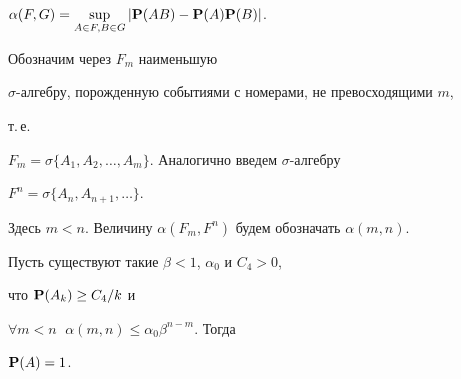 $\alpha(F,G)=\sup\limits_{A\in F,B\in G}|{\bold P}(AB)-{\bold P} 


(A){\bold P}(B)|$. 


Обозначим через $F_m$ наименьшую 


$\sigma$-алгебру, порожденную событиями с номерами, не превосходящими $m$, 


т.\,е. 


$F_m=\sigma\{A_1,A_2,\dotsc,A_m\}$. Аналогично введем $\sigma$-алгебру 


$F^n=\sigma\{A_n,A_{n+1},\dotsc\}$. 


Здесь $m<n$. Величину $\alpha(F_m,F^n)$ будем обозначать $\alpha(m,n)$. 


 


\begin{lems} Пусть существуют такие $\beta<1$, $\alpha_0$ и $C_4>0$, 


что ${\bold P}(A_k)\ge C_4/k$ и 


$\forall m<n\;$ $\alpha(m,n)\le\alpha_0\beta^{n-m}$. Тогда 


${\bold P}(A)=1$. 


\end{lems} 


 


